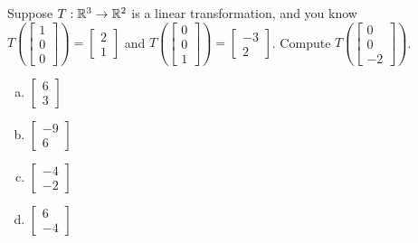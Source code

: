 \begin{applicationActivities}{1}{17}
\begin{activity}{3}
Suppose $T: \mathbb{R}^3 \rightarrow \mathbb{R}^2$ is a linear transformation, and you know $T\left(\begin{bmatrix} 1 \\ 0 \\ 0 \end{bmatrix} \right) = \begin{bmatrix} 2 \\ 1 \end{bmatrix} $ and $T\left(\begin{bmatrix} 0 \\ 0 \\ 1 \end{bmatrix} \right) = \begin{bmatrix} -3 \\ 2 \end{bmatrix} $.  Compute $T\left(\begin{bmatrix} 0 \\ 0 \\ -2 \end{bmatrix}\right)$.
\begin{multicols}{2}
\begin{enumerate}[(a)]
\item $\begin{bmatrix} 6 \\ 3\end{bmatrix}$
\item $\begin{bmatrix} -9 \\ 6 \end{bmatrix}$
\item $\begin{bmatrix} -4 \\ -2 \end{bmatrix}$
\item $\begin{bmatrix} 6 \\ -4 \end{bmatrix}$
\end{enumerate}
\end{multicols}
\end{activity}


\end{applicationActivities}
